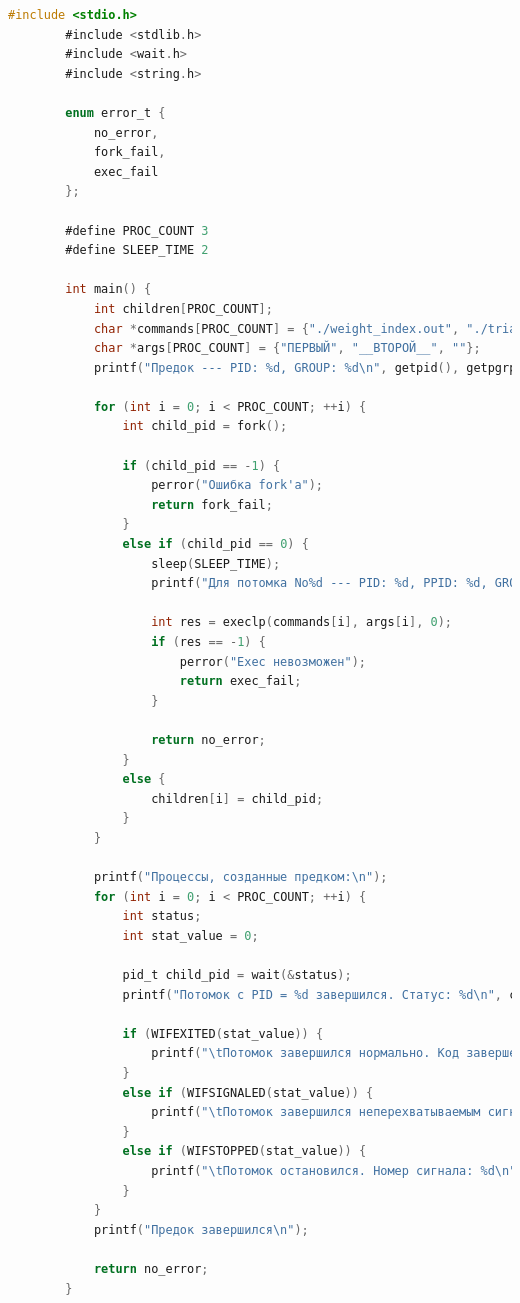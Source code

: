 \documentclass[12pt]{report}
\begin{document}
	\begin{lstlisting}[label=code:exec, caption=exec(), language=C]
		#include <stdio.h>
		#include <stdlib.h>
		#include <wait.h>
		#include <string.h>
		
		enum error_t {
			no_error,
			fork_fail,
			exec_fail
		};
		
		#define PROC_COUNT 3
		#define SLEEP_TIME 2
		
		int main() {
			int children[PROC_COUNT];
			char *commands[PROC_COUNT] = {"./weight_index.out", "./triangle_type.out"};
			char *args[PROC_COUNT] = {"ПЕРВЫЙ", "__ВТОРОЙ__", ""};
			printf("Предок --- PID: %d, GROUP: %d\n", getpid(), getpgrp());
			
			for (int i = 0; i < PROC_COUNT; ++i) {
				int child_pid = fork();
				
				if (child_pid == -1) {
					perror("Ошибка fork'а");
					return fork_fail;
				}
				else if (child_pid == 0) {
					sleep(SLEEP_TIME);
					printf("Для потомка No%d --- PID: %d, PPID: %d, GROUP: %d\n", i + 1, getpid(), getppid(), getpgrp());
					
					int res = execlp(commands[i], args[i], 0);
					if (res == -1) {
						perror("Exec невозможен");
						return exec_fail;
					}
					
					return no_error;
				}
				else {
					children[i] = child_pid;
				}
			}
			
			printf("Процессы, созданные предком:\n");
			for (int i = 0; i < PROC_COUNT; ++i) {
				int status;
				int stat_value = 0;
				
				pid_t child_pid = wait(&status);
				printf("Потомок с PID = %d завершился. Статус: %d\n", children[i], status);
				
				if (WIFEXITED(stat_value)) {
					printf("\tПотомок завершился нормально. Код завершения: %d\n", WEXITSTATUS(stat_value));
				}
				else if (WIFSIGNALED(stat_value)) {
					printf("\tПотомок завершился неперехватываемым сигналом. Номер сигнала: %d\n", WTERMSIG(stat_value));
				}
				else if (WIFSTOPPED(stat_value)) {
					printf("\tПотомок остановился. Номер сигнала: %d\n", WSTOPSIG(stat_value));
				}
			}
			printf("Предок завершился\n");
			
			return no_error;
		}
	\end{lstlisting}
\end{document}
